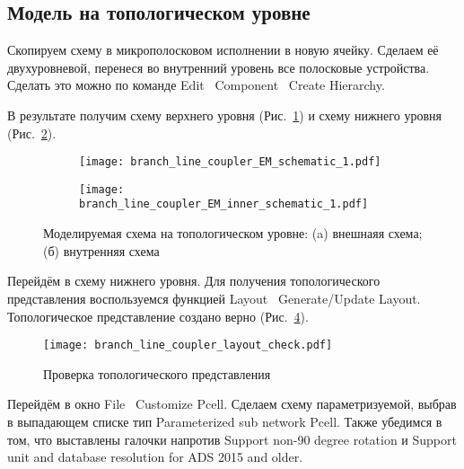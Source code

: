 \subsection{Модель на топологическом уровне}

Скопируем схему в микрополосковом исполнении в новую ячейку. Сделаем её двухуровневой, перенеся во внутренний уровень все полосковые устройства. Сделать это можно по команде Edit \textrightarrow\ Component \textrightarrow\ Create Hierarchy.

В результате получим схему верхнего уровня (Рис.~\ref{fig:branch_line_coupler_EM_schematic}) и схему нижнего уровня (Рис.~\ref{fig:branch_line_coupler_EM_inner_schematic}).

\begin{figure}[!ht]
    \centering
    \begin{subfigure}[b]{0.45\textwidth}
        \centering
        \texttt{[image: branch\_line\_coupler\_EM\_schematic\_1.pdf]}
        \caption{}%
    \label{fig:branch_line_coupler_EM_schematic}
    \end{subfigure}
    \hfill
    \begin{subfigure}[b]{0.45\textwidth}
        \centering
        \texttt{[image: branch\_line\_coupler\_EM\_inner\_schematic\_1.pdf]}
        \caption{}%
    \label{fig:branch_line_coupler_EM_inner_schematic}
    \end{subfigure}
    \caption{%
        Моделируемая схема на топологическом уровне:
        (a) внешнаяя схема;
        (б) внутренняя схема
    }%
    \label{fig:branch_line_coupler_EM_schematics}
\end{figure}

Перейдём в схему нижнего уровня. Для получения топологического представления воспользуемся функцией Layout \textrightarrow\ Generate/Update Layout.
Топологическое представление создано верно (Рис.~\ref{fig:branch_line_coupler_layout_check}).

\begin{figure}[!ht]
    \centering
    \texttt{[image: branch\_line\_coupler\_layout\_check.pdf]}
    \caption{Проверка топологического представления}%
    \label{fig:branch_line_coupler_layout_check}
\end{figure}

Перейдём в окно File \textrightarrow\ Customize Pcell.
Сделаем схему параметризуемой, выбрав в выпадающем списке тип Parameterized sub network Pcell.
Также убедимся в том, что выставлены галочки напротив Support non-90 degree rotation и Support unit and database resolution for ADS 2015 and older.

